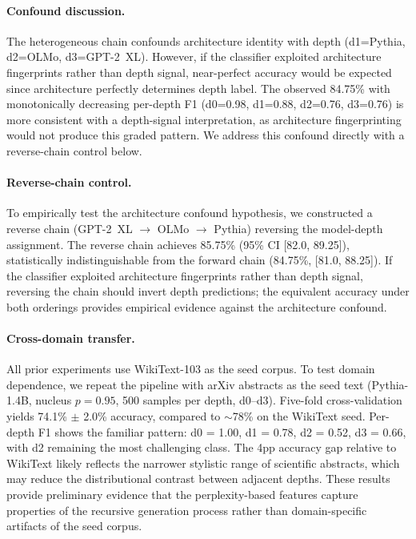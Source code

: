 \paragraph{Confound discussion.}
The heterogeneous chain confounds architecture identity with depth (d1=Pythia, d2=OLMo, d3=GPT-2~XL).
However, if the classifier exploited architecture fingerprints rather than depth signal, near-perfect accuracy would be expected since architecture perfectly determines depth label.
The observed 84.75\% with monotonically decreasing per-depth F1 (d0=0.98, d1=0.88, d2=0.76, d3=0.76) is more consistent with a depth-signal interpretation, as architecture fingerprinting would not produce this graded pattern.
We address this confound directly with a reverse-chain control below.

\paragraph{Reverse-chain control.}
To empirically test the architecture confound hypothesis, we constructed a reverse chain (GPT-2~XL $\to$ OLMo $\to$ Pythia) reversing the model-depth assignment.
The reverse chain achieves 85.75\% (95\% CI [82.0, 89.25]), statistically indistinguishable from the forward chain (84.75\%, [81.0, 88.25]).
If the classifier exploited architecture fingerprints rather than depth signal, reversing the chain should invert depth predictions; the equivalent accuracy under both orderings provides empirical evidence against the architecture confound.

\paragraph{Cross-domain transfer.}
All prior experiments use WikiText-103 as the seed corpus.
To test domain dependence, we repeat the pipeline with arXiv abstracts as the seed text (Pythia-1.4B, nucleus $p{=}0.95$, 500 samples per depth, d0--d3).
Five-fold cross-validation yields 74.1\% $\pm$ 2.0\% accuracy, compared to ${\sim}$78\% on the WikiText seed.
Per-depth F1 shows the familiar pattern: d0 = 1.00, d1 = 0.78, d2 = 0.52, d3 = 0.66, with d2 remaining the most challenging class.
The 4pp accuracy gap relative to WikiText likely reflects the narrower stylistic range of scientific abstracts, which may reduce the distributional contrast between adjacent depths.
These results provide preliminary evidence that the perplexity-based features capture properties of the recursive generation process rather than domain-specific artifacts of the seed corpus.

